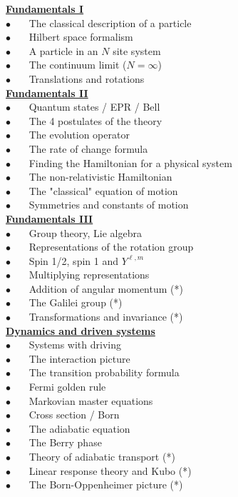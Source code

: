 \documentclass[onecolumn,fleqn, 11pt]{revtex4}
\newcommand{\bitem}{$\bullet$ \ \ \ }
\newcommand{\mpgt}[2][1.0\hsize]{\begin{minipage}[t]{#1}{#2}\end{minipage}}
\begin{document}
\mpgt[0.48\hsize]{

\small
\hyperlink{shdA1.1}{\bf Fundamentals I} \\

\bitem The classical description of a particle  \\
\bitem Hilbert space formalism  \\
\bitem A particle in an $N$ site system  \\
\bitem The continuum limit ($N=\infty$) \\
\bitem Translations and rotations \\

\hyperlink{shdA2.1}{\bf Fundamentals II} \\

\bitem Quantum states / EPR / Bell \\
\bitem The 4 postulates of the theory   \\
\bitem The evolution operator \\
\bitem The rate of change formula \\
\bitem Finding the Hamiltonian for a physical system \\
\bitem The non-relativistic Hamiltonian \\
\bitem The "classical" equation of motion \\
\bitem Symmetries and constants of motion \\

\hyperlink{shdA3.1}{\bf Fundamentals III} \\

\bitem Group theory, Lie algebra \\
\bitem Representations of the rotation group \\
\bitem Spin 1/2, spin 1 and $Y^{\ell,m}$ \\
\bitem Multiplying representations \\
\bitem Addition of angular momentum (*) \\
\bitem The Galilei group (*) \\
\bitem Transformations and invariance (*) \\


\hyperlink{shdA4.1}{\bf Dynamics and driven systems} \\

\bitem Systems with driving \\ 
\bitem The interaction picture \\
\bitem The transition probability formula \\ 
\bitem Fermi golden rule \\
\bitem Markovian master equations \\
\bitem Cross section / Born \\
\bitem The adiabatic equation \\
\bitem The Berry phase \\
\bitem Theory of adiabatic transport (*) \\
\bitem Linear response theory and Kubo (*) \\
\bitem The Born-Oppenheimer picture (*) 

}
\end{document}
